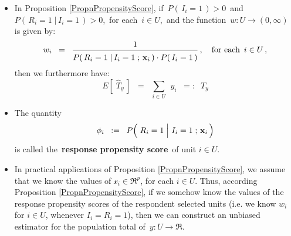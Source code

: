 \begin{remark}
\mbox{}\vskip 0.05cm
\begin{itemize}
\item
	In Proposition \ref{PropnPropensityScore},
	if \,$P(\,I_{i}=1\,) >0$\, and \,$P(\,R_{i}=1\;\vert\,I_{i}=1\,) > 0$,\,
	for each \,$i \in U$,\, and the function \,$w : U \longrightarrow (0,\infty)$\, is given by:
	\begin{equation*}
	w_{i}
	\;\; = \;\;
		\dfrac{1}{\overset{{\color{white}.}}{P}(\,R_{i}=1\;\vert\,I_{i}=1\;;\,\mathbf{x}_{i}\,)
		\cdot P(\,I_{i}=1\,)}\,,
	\quad
	\textnormal{for each \,$i \in U$}\,,
	\end{equation*}
	then we furthermore have:
	\begin{equation*}
	E\!\left[\;\widehat{T}_{y}\,\right]
	\;\; = \;\;
		\underset{i \in U}{\sum}\;\,y_{i}
	\;\; =: \;\;
		T_{y}
	\end{equation*}
\item
	The quantity
	\begin{equation*}
	\phi_{i}
	\;\; := \;\;
		P\!\left(\,\left.R_{i}\overset{{\color{white}-}}{=}1\;\right\vert\,I_{i}=1\;;\,\mathbf{x}_{i}\,\right)
	\end{equation*}
	is called the \,\textbf{response propensity score}\, of unit $i \in U$.
\item
	In practical applications of Proposition \ref{PropnPropensityScore}, we assume
	that we know the values of $\mathcal{x}_{i} \in \Re^{p}$, for each $i \in U$.
	Thus, according Proposition \ref{PropnPropensityScore}, if we somehow
	know the values of the response propensity scores of the respondent selected units
	(i.e. we know $w_{i}$ for $i \in U$, whenever $I_{i} = R_{i} = 1$), then we can construct
	an unbiased estimator for the population total of \,$y : U \longrightarrow \Re$.	
\end{itemize}
\end{remark}


